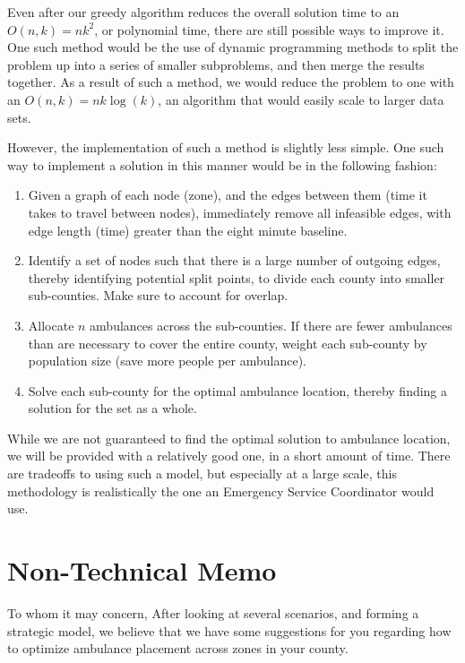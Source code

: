 \documentclass[notitlepage, 12pt]{article}
\begin{document}
Even after our greedy algorithm reduces the overall solution time to an $O(n, k) = nk^2$, or polynomial time, there
are still possible ways to improve it. One such method would be the use of dynamic programming methods to split the
problem up into a series of smaller subproblems, and then merge the results together. As a result of such a method,
we would reduce the problem to one with an $O(n, k) = nk\log(k)$, an algorithm that would easily scale to larger data sets.

However, the implementation of such a method is slightly less simple.
One such way to implement a solution in this manner would be in the following fashion:

\begin{enumerate}
\item Given a graph of each node (zone), and the edges between them (time it takes to travel between nodes),
    immediately remove all infeasible edges, with edge length (time) greater than the eight minute baseline.

\item Identify a set of nodes such that there is a large number of outgoing edges, thereby identifying potential
    split points, to divide each county into smaller sub-counties. Make sure to account for overlap.

\item Allocate $n$ ambulances across the sub-counties. If there are fewer ambulances than are necessary to cover
    the entire county, weight each sub-county by population size (save more people per ambulance).

\item Solve each sub-county for the optimal ambulance location, thereby finding a solution for the set as a whole.
\end{enumerate}

While we are not guaranteed to find the optimal solution to ambulance location, we will be provided with a relatively
good one, in a short amount of time. There are tradeoffs to using such a model, but especially at a large scale,
this methodology is realistically the one an Emergency Service Coordinator would use.

\newpage
\section{Non-Technical Memo}
To whom it may concern,
After looking at several scenarios, and forming a strategic model, we believe that we have some
suggestions for you regarding how to optimize ambulance placement across zones in your county.
\end{document}
